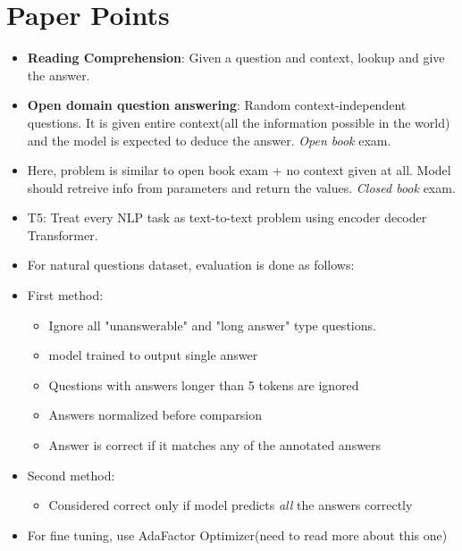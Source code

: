 \documentclass[a4paper]{article}
\begin{document}
\section{Paper Points}
\begin{itemize}
    \item \textbf{Reading Comprehension}: Given a question and context, lookup and give the answer.
    \item \textbf{Open domain question answering}: Random context-independent questions. It is given entire context(all the information possible in the world) and the model is expected to deduce the answer. \textit{Open book} exam.
    \item Here, problem is similar to open book exam + no context given at all. Model should retreive info from parameters and return the values. \textit{Closed book} exam.
    \item T5: Treat every NLP task as text-to-text problem using encoder decoder Transformer.
    \item For natural questions dataset, evaluation is done as follows: 
    \item First method:
        \begin{itemize}
            \item Ignore all "unanswerable" and "long answer" type questions.
            \item model trained to output single answer
            \item Questions with answers longer than 5 tokens are ignored
            \item Answers normalized before comparsion
            \item Answer is correct if it matches any of the annotated answers
        \end{itemize}
    \item Second method:
        \begin{itemize}
            \item Considered correct only if model predicts \textit{all} the answers correctly
        \end{itemize}
    \item For fine tuning, use AdaFactor Optimizer(need to read more about this one)
\end{itemize}
\end{document}
